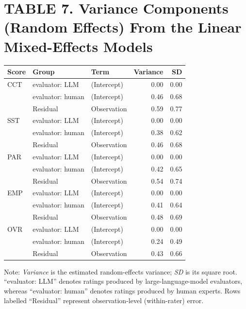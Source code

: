 \documentclass{wiley-article}
\begin{document}
\begin{table}[htbp] %
  \section*{TABLE 7. Variance Components (Random Effects) From the Linear Mixed-Effects Models}
  \centering
  \footnotesize         %
  \begin{threeparttable}
    \label{tab:lme_variance}
    \begin{tabular}{l l l r r}
      \toprule
      \textbf{Score} & \textbf{Group} & \textbf{Term} & \textbf{Variance} & \textbf{SD} \\
      \midrule
      CCT & evaluator: LLM   & (Intercept) & 0.00 & 0.00 \\
          & evaluator: human & (Intercept) & 0.46 & 0.68 \\
          & Residual         & Observation & 0.59 & 0.77 \\
      \addlinespace
      SST & evaluator: LLM   & (Intercept) & 0.00 & 0.00 \\
          & evaluator: human & (Intercept) & 0.38 & 0.62 \\
          & Residual         & Observation & 0.46 & 0.68 \\
      \addlinespace
      PAR & evaluator: LLM   & (Intercept) & 0.00 & 0.00 \\
          & evaluator: human & (Intercept) & 0.42 & 0.65 \\
          & Residual         & Observation & 0.54 & 0.74 \\
      \addlinespace
      EMP & evaluator: LLM   & (Intercept) & 0.00 & 0.00 \\
          & evaluator: human & (Intercept) & 0.41 & 0.64 \\
          & Residual         & Observation & 0.48 & 0.69 \\
      \addlinespace
      OVR & evaluator: LLM   & (Intercept) & 0.00 & 0.00 \\
          & evaluator: human & (Intercept) & 0.24 & 0.49 \\
          & Residual         & Observation & 0.43 & 0.66 \\
      \bottomrule
    \end{tabular}
    \begin{tablenotes}
      \scriptsize
      \item Note: \textit{Variance} is the estimated random-effects variance; \textit{SD} is its square root. “evaluator: LLM” denotes ratings produced by large-language-model evaluators, whereas “evaluator: human” denotes ratings produced by human experts. Rows labelled “Residual” represent observation-level (within-rater) error.
    \end{tablenotes}
  \end{threeparttable}
\end{table}
\end{document}
